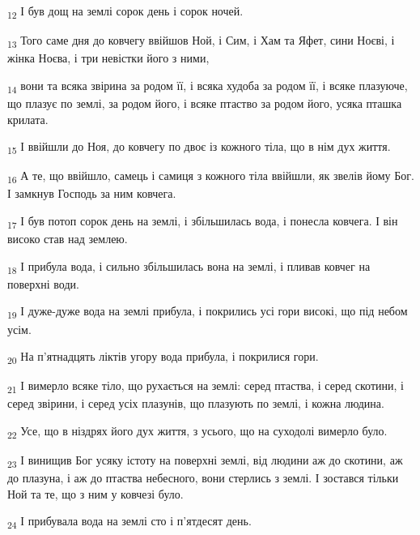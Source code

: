 \begin{tcolorbox}
\textsubscript{12} І був дощ на землі сорок день і сорок ночей.
\end{tcolorbox}
\begin{tcolorbox}
\textsubscript{13} Того саме дня до ковчегу ввійшов Ной, і Сим, і Хам та Яфет, сини Ноєві, і жінка Ноєва, і три невістки його з ними,
\end{tcolorbox}
\begin{tcolorbox}
\textsubscript{14} вони та всяка звірина за родом її, і всяка худоба за родом її, і всяке плазуюче, що плазує по землі, за родом його, і всяке птаство за родом його, усяка пташка крилата.
\end{tcolorbox}
\begin{tcolorbox}
\textsubscript{15} І ввійшли до Ноя, до ковчегу по двоє із кожного тіла, що в нім дух життя.
\end{tcolorbox}
\begin{tcolorbox}
\textsubscript{16} А те, що ввійшло, самець і самиця з кожного тіла ввійшли, як звелів йому Бог. І замкнув Господь за ним ковчега.
\end{tcolorbox}
\begin{tcolorbox}
\textsubscript{17} І був потоп сорок день на землі, і збільшилась вода, і понесла ковчега. І він високо став над землею.
\end{tcolorbox}
\begin{tcolorbox}
\textsubscript{18} І прибула вода, і сильно збільшилась вона на землі, і пливав ковчег на поверхні води.
\end{tcolorbox}
\begin{tcolorbox}
\textsubscript{19} І дуже-дуже вода на землі прибула, і покрились усі гори високі, що під небом усім.
\end{tcolorbox}
\begin{tcolorbox}
\textsubscript{20} На п'ятнадцять ліктів угору вода прибула, і покрилися гори.
\end{tcolorbox}
\begin{tcolorbox}
\textsubscript{21} І вимерло всяке тіло, що рухається на землі: серед птаства, і серед скотини, і серед звірини, і серед усіх плазунів, що плазують по землі, і кожна людина.
\end{tcolorbox}
\begin{tcolorbox}
\textsubscript{22} Усе, що в ніздрях його дух життя, з усього, що на суходолі вимерло було.
\end{tcolorbox}
\begin{tcolorbox}
\textsubscript{23} І винищив Бог усяку істоту на поверхні землі, від людини аж до скотини, аж до плазуна, і аж до птаства небесного, вони стерлись з землі. І зостався тільки Ной та те, що з ним у ковчезі було.
\end{tcolorbox}
\begin{tcolorbox}
\textsubscript{24} І прибувала вода на землі сто і п'ятдесят день.
\end{tcolorbox}
